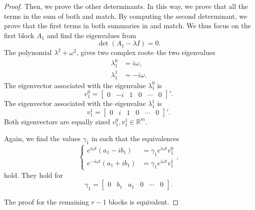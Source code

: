 \begin{proof}
Then, we prove the other determinants. In this way, we prove that all the terms in the sum of both  and  match. 
By computing the second determinant, we prove that the first terms in both summaries in  and  match. We thus focus on the first block $A_1$ and find the eigenvalues from 
\begin{equation}
  \det(A_1-\lambda I)=0.
\end{equation}
The polynomial $\lambda^2+\omega^2$, gives two complex roots--the two eigenvalues
\begin{subequations}\begin{align}
  \lambda_1^0&=i\omega,\\
  \lambda_1^1&=-i\omega.
\end{align}
\end{subequations}
The eigenvector associated with the eigenvalue $\lambda_1^0$ is 
\begin{equation}
  v_1^0=\begin{bmatrix}0 & -i&1&0&\cdots&0\end{bmatrix}'.  
\end{equation}
The eigenvector associated with the eigenvalue $\lambda_1^1$ is 
\begin{equation}
  v_1^1=\begin{bmatrix}0&i&1&0&\cdots&0\end{bmatrix}'. 
\end{equation}
Both eigenvectors are equally sized $v_1^0,v_1^1\in\mathbb{R}^m$.

Again, we find the values $\gamma_1$ in  such that the equivalences 
\begin{equation}\begin{cases}    
  e^{i\omega t}(a_1-ib_1)&=\gamma_1 e^{i\omega t}v_1^0\\
  e^{-i\omega t}(a_1+ib_1)&=\gamma_1 e^{i\omega t}v_1^1
\end{cases},\end{equation}
hold. They hold for 
\begin{equation}
  \gamma_1=\begin{bmatrix}0&b_1&a_1&0&\cdots&0\end{bmatrix}.
\end{equation} 

The proof for the remaining $r-1$ blocks is equivalent.


\end{proof}
